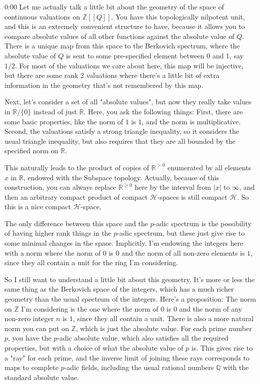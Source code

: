 \begin{unfinished}{0:00}
Let me actually talk a little bit about the geometry of the space of continuous valuations on $\mathbb{Z}[[Q]]$. You have this topologically nilpotent unit, and this is an extremely convenient structure to have, because it allows you to compare absolute values of all other functions against the absolute value of $Q$. There is a unique map from this space to the Berkovich spectrum, where the absolute value of $Q$ is sent to some pre-specified element between 0 and 1, say $1/2$. For most of the valuations we care about here, this map will be injective, but there are some rank 2 valuations where there's a little bit of extra information in the geometry that's not remembered by this map.

Next, let's consider a set of all "absolute values", but now they really take values in $\mathbb{R}/\{0\}$ instead of just $\mathbb{R}$. Here, you ask the following things: First, there are some basic properties, like the norm of $1$ is $1$, and the norm is multiplicative. Second, the valuations satisfy a strong triangle inequality, so it considers the usual triangle inequality, but also requires that they are all bounded by the specified norm on $\mathbb{R}$. 

This naturally leads to the product of copies of $\mathbb{R}^{>0}$ enumerated by all elements $x$ in $\mathbb{R}$, endowed with the Subspace topology. Actually, because of this construction, you can always replace $\mathbb{R}^{\ge0}$ here by the interval from $|x|$ to $\infty$, and then an arbitrary compact product of compact $\mathcal{H}$-spaces is still compact $\mathcal{H}$. So this is a nice compact $\mathcal{H}$-space.

The only difference between this space and the $p$-adic spectrum is the possibility of having higher rank things in the $p$-adic spectrum, but these just give rise to some minimal changes in the space. Implicitly, I'm endowing the integers here with a norm where the norm of $0$ is $0$ and the norm of all non-zero elements is $1$, since they all contain a unit for the ring I'm considering.

So I still want to understand a little bit about this geometry. It's more or less the same thing as the Berkovich space of the integers, which has a much richer geometry than the usual spectrum of the integers. Here's a proposition: The norm on $\mathbb{Z}$ I'm considering is the one where the norm of $0$ is $0$ and the norm of any non-zero integer $n$ is $1$, since they all contain a unit. There is also a more natural norm you can put on $\mathbb{Z}$, which is just the absolute value. For each prime number $p$, you have the $p$-adic absolute value, which also satisfies all the required properties, but with a choice of what the absolute value of $p$ is. This gives rise to a "ray" for each prime, and the inverse limit of joining these rays corresponds to maps to complete $p$-adic fields, including the usual rational numbers $\mathbb{Q}$ with the standard absolute value.


\end{unfinished}
